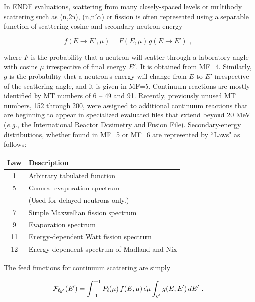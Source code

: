 In ENDF evaluations, scattering from many closely-spaced levels or
multibody scattering such as (n,2n), (n,n$'\alpha$) or fission is often
represented using a separable function of scattering cosine and
secondary neutron energy

  \begin{equation}
    f(E{\rightarrow}E',\mu)=F(E,\mu)\,g(E{\rightarrow}E')\,\,,
  \label{Eq83}
  \end{equation}

\noindent
where $F$ is the probability that a neutron will scatter through a
laboratory angle with cosine $\mu$ irrespective of final energy $E'$.  It is
obtained from MF=4.  Similarly, $g$ is the probability that a neutron's
energy will change from $E$ to $E'$ irrespective of the scattering angle,
and it is given in MF=5.  Continuum reactions are mostly identified by
MT numbers of 6 -- 49 and 91.  Recently, previously unused MT numbers,
152 through 200, were assigned to additional continuum reactions
that are beginning to appear in specialized evaluated files that extend
beyond 20 MeV ({\it e.g.}, the International Reactor Dosimetry and Fusion
File).  Secondary-energy distributions, whether found in MF=5 or MF=6
are represented by ``Laws" as follows:

\begin{center}
\begin{tabular}{cl}
Law & Description \\ \hline
1  & Arbitrary tabulated function \\
5  & General evaporation spectrum \\
   & (Used for delayed neutrons only.) \\
7  & Simple Maxwellian fission spectrum \\
9  & Evaporation spectrum \\
11 & Energy-dependent Watt fission spectrum \\
12 & Energy-dependent spectrum of Madland and Nix \\ \hline
\end{tabular}
\end{center}
\vspace{3 pt}

The feed functions for continuum scattering are simply

  \begin{equation}
    {\cal F}_{\ell g'}(E') = \int_{-1}^{+1} P_{\ell}(\mu) \,f(E,\mu)\,d\mu
    \int_{g'} g(E,E')\,dE'\,\,.
  \end{equation}
\vspace{0.5 pt}

